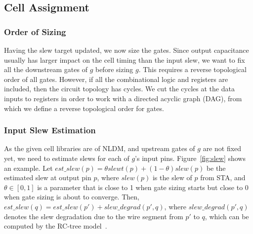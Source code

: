 
\subsection{Cell Assignment}

\subsubsection{Order of Sizing}
\label{sec:sizing_order}

Having the slew target updated, we now size the gates. Since output capacitance usually has larger impact on the cell timing than the input slew, we want to fix all the downstream gates of $g$ before sizing $g$. This requires a reverse topological order of all gates. However, if all the combinational logic and registers are included, then the circuit topology has cycles. We cut the cycles at the data inputs to registers in order to work with a directed acyclic graph (DAG), from which we define a reverse topological order for gates.

\subsubsection{Input Slew Estimation}
As the given cell libraries are of NLDM, and upstream gates of $g$ are not fixed yet, we need to estimate slews for each of $g$'s input pins. Figure~\ref{fig:slew} shows an example. Let $est\_slew(p) = \theta slewt(p) + (1-\theta)slew(p)$ be the estimated slew at output pin $p$, where $slew(p)$ is the slew of $p$ from STA, and $\theta \in [0,1]$ is a parameter that is close to 1 when gate sizing starts but close to 0 when gate sizing is about to converge. Then, $est\_slew(q) = est\_slew(p') + slew\_degrad(p', q)$, where $slew\_degrad(p', q)$ denotes the slew degradation due to the wire segment from $p'$ to $q$, which can be computed by the RC-tree model~\cite{TAU:Contest}.

